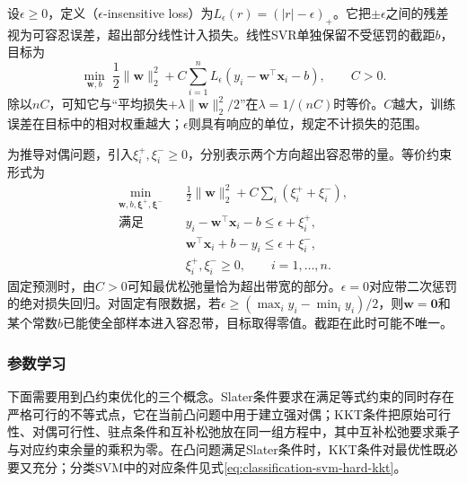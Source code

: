 设$\epsilon\geq0$，定义（$\epsilon$-insensitive loss）为$L_\epsilon(r)=(|r|-\epsilon)_+$。它把$\pm\epsilon$之间的残差视为可容忍误差，超出部分线性计入损失。线性SVR单独保留不受惩罚的截距$b$，目标为
\begin{equation}
  \min_{\bm{w},b}\;
    \frac12\lVert\bm{w}\rVert_2^2+
    C\sum_{i=1}^{n}L_\epsilon(y_i-\bm{w}^{\top}\bm{x}_i-b),
    \qquad C>0.
  \label{eq:regression-svr-objective}
\end{equation}
除以$nC$，可知它与“平均损失$+\lambda\lVert\bm{w}\rVert_2^2/2$”在$\lambda=1/(nC)$时等价。$C$越大，训练误差在目标中的相对权重越大；$\epsilon$则具有响应的单位，规定不计损失的范围。

为推导对偶问题，引入$\xi_i^+,\xi_i^-\geq0$，分别表示两个方向超出容忍带的量。等价约束形式为
\begin{equation}
  \begin{aligned}
    \min_{\bm{w},b,\bm{\xi}^+,\bm{\xi}^-}\quad&
       \tfrac12\lVert\bm{w}\rVert_2^2+C\sum_i(\xi_i^++\xi_i^-),\\
    \text{满足}\quad&
       y_i-\bm{w}^{\top}\bm{x}_i-b\leq\epsilon+\xi_i^+,\\
      &\bm{w}^{\top}\bm{x}_i+b-y_i\leq\epsilon+\xi_i^-,\\
      &\xi_i^+,\xi_i^-\geq0,\qquad i=1,\ldots,n.
  \end{aligned}
  \label{eq:regression-svr-primal}
\end{equation}
固定预测时，由$C>0$可知最优松弛量恰为超出带宽的部分。$\epsilon=0$对应带二次惩罚的绝对损失回归。对固定有限数据，若$\epsilon\geq(\max_i y_i-\min_i y_i)/2$，则$\bm{w}=\bm{0}$和某个常数$b$已能使全部样本进入容忍带，目标取得零值。截距在此时可能不唯一。

\subsubsection{参数学习}

下面需要用到凸约束优化的三个概念。Slater条件要求在满足等式约束的同时存在严格可行的不等式点，它在当前凸问题中用于建立强对偶；KKT条件把原始可行性、对偶可行性、驻点条件和互补松弛放在同一组方程中，其中互补松弛要求乘子与对应约束余量的乘积为零。在凸问题满足Slater条件时，KKT条件对最优性既必要又充分；分类SVM中的对应条件见式\eqref{eq:classification-svm-hard-kkt}。


